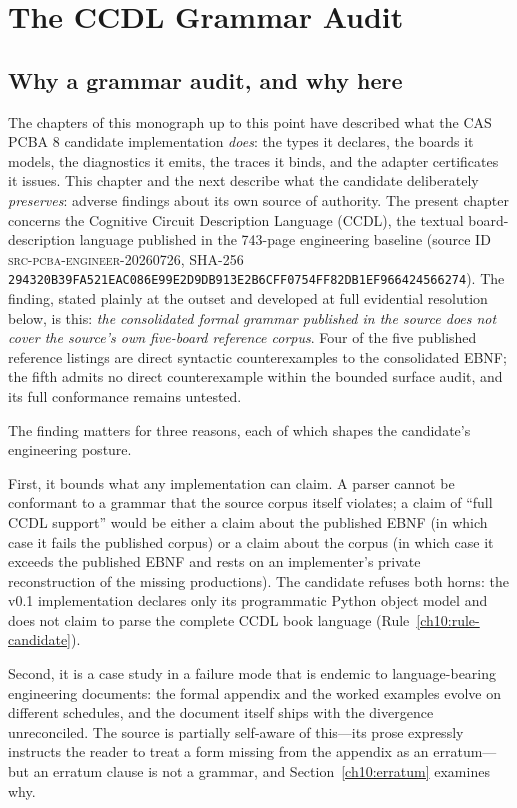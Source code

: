 \chapter{The CCDL Grammar Audit}\label{ch10:main}

\section{Why a grammar audit, and why here}\label{ch10:why}

The chapters of this monograph up to this point have described what the CAS PCBA 8 candidate implementation \emph{does}: the types it declares, the boards it models, the diagnostics it emits, the traces it binds, and the adapter certificates it issues. This chapter and the next describe what the candidate deliberately \emph{preserves}: adverse findings about its own source of authority. The present chapter concerns the Cognitive Circuit Description Language (CCDL), the textual board-description language published in the 743-page engineering baseline (source ID \textsc{src-pcba-engineer-20260726}, SHA-256 \texttt{294320B39FA521EAC086E99E2D9DB913E2B6CFF0754FF82DB1EF966424566274}). The finding, stated plainly at the outset and developed at full evidential resolution below, is this: \emph{the consolidated formal grammar published in the source does not cover the source's own five-board reference corpus}. Four of the five published reference listings are direct syntactic counterexamples to the consolidated EBNF; the fifth admits no direct counterexample within the bounded surface audit, and its full conformance remains untested.

The finding matters for three reasons, each of which shapes the candidate's engineering posture.

First, it bounds what any implementation can claim. A parser cannot be conformant to a grammar that the source corpus itself violates; a claim of ``full CCDL support'' would be either a claim about the published EBNF (in which case it fails the published corpus) or a claim about the corpus (in which case it exceeds the published EBNF and rests on an implementer's private reconstruction of the missing productions). The candidate refuses both horns: the v0.1 implementation declares only its programmatic Python object model and does not claim to parse the complete CCDL book language (Rule~\ref{ch10:rule-candidate}).

Second, it is a case study in a failure mode that is endemic to language-bearing engineering documents: the formal appendix and the worked examples evolve on different schedules, and the document itself ships with the divergence unreconciled. The source is partially self-aware of this---its prose expressly instructs the reader to treat a form missing from the appendix as an erratum---but an erratum clause is not a grammar, and Section~\ref{ch10:erratum} examines why.

